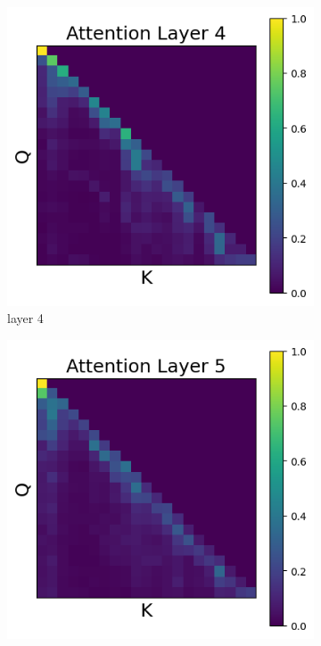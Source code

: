 \documentclass[11pt]{article}
\begin{document}
\begin{figure}[t]
  \begin{subfigure}[t]{0.24\textwidth}
    \centering
    \includegraphics[width=1.4\columnwidth]{figures/intervention2/layer_4.png}
    \caption{layer 4}
    \label{fig:obs2_layer4}
  \end{subfigure}\hfill
  \begin{subfigure}[t]{0.24\textwidth}
    \centering
    \includegraphics[width=1.4\columnwidth]{figures/intervention2/layer_5.png}

\end{subfigure}
\end{figure}
\end{document}
